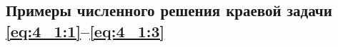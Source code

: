 %
%
%
%
%
%


\subsection{Примеры численного решения краевой задачи \eqref{eq:4_1:1}--\eqref{eq:4_1:3}}
\label{subsec:ch4/sec1/boundary}


